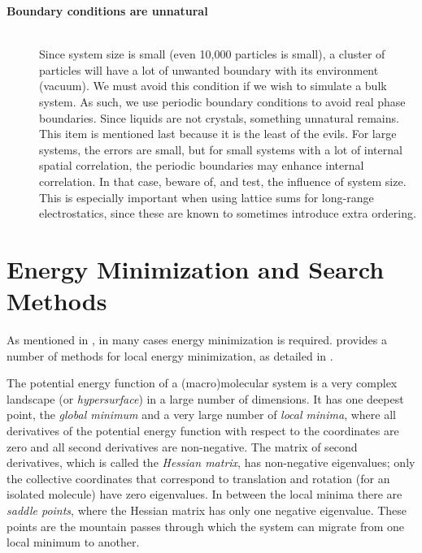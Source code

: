 \begin{description}
\item[{\bf Boundary conditions are unnatural}]\mbox{}\\
Since system size is small (even 10,000 particles is small), a cluster
of particles will have a lot of unwanted boundary with its environment
(vacuum). We must avoid this condition if we wish to simulate a bulk system.
As such, we use periodic boundary conditions to avoid real phase
boundaries. Since liquids are not crystals, something unnatural
remains. This item is mentioned last because it is the
least of the evils. For large systems, the errors are small, but for
small systems with a lot of internal spatial correlation, the periodic
boundaries may enhance internal correlation. In that case, beware of, and
test, the influence of system size. This is especially important when
using lattice sums for long-range electrostatics, since these are known
to sometimes introduce extra ordering.
\end{description}

\section{Energy Minimization and Search Methods}

As mentioned in , in many cases energy minimization
is required. {\gromacs} provides a number of methods for local energy
minimization, as detailed in .

The potential energy function of a (macro)molecular system is a very
complex landscape (or {\em hypersurface}) in a large number of
dimensions. It has one deepest point, the {\em global minimum} and a
very large number of {\em local minima}, where all derivatives of the
potential energy function with respect to the coordinates are zero and
all second derivatives are non-negative. The matrix of second
derivatives, which is called the {\em Hessian matrix}, has non-negative
eigenvalues; only the collective coordinates that correspond to
translation and rotation (for an isolated molecule) have zero
eigenvalues. In between the local minima there are {\em saddle
points}, where the Hessian matrix has only one negative
eigenvalue. These points are the mountain passes through which the
system can migrate from one local minimum to another.

